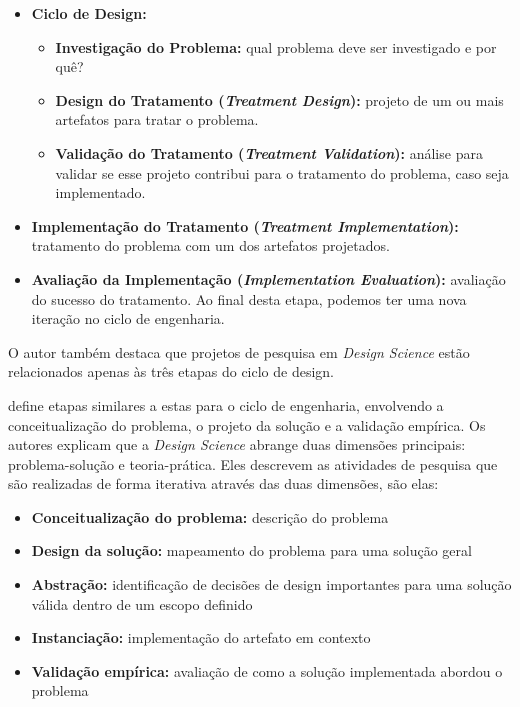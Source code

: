 \begin{itemize}
    \item \textbf{Ciclo de Design:}
    \begin{itemize}
        \item \textbf{Investigação do Problema:} qual problema deve ser investigado e por quê?
        \item \textbf{Design do Tratamento (\textit{Treatment Design}):} projeto de um ou mais artefatos para tratar o problema.
        \item \textbf{Validação do Tratamento (\textit{Treatment Validation}):} análise para validar se esse projeto contribui para o tratamento do problema, caso seja implementado.
    \end{itemize}
    \item \textbf{Implementação do Tratamento (\textit{Treatment Implementation}):} tratamento do problema com um dos artefatos projetados.
    \item \textbf{Avaliação da Implementação (\textit{Implementation Evaluation}):} avaliação do sucesso do tratamento. Ao final desta etapa, podemos ter uma nova iteração no ciclo de engenharia.
\end{itemize}

\noindent O autor também destaca que projetos de pesquisa em \textit{Design Science} estão relacionados apenas às três etapas do ciclo de design.

\citet{runeson2020design} define etapas similares a estas para o ciclo de engenharia, envolvendo a conceitualização do problema, o projeto da solução e a validação empírica. Os autores explicam que a \textit{Design Science} abrange duas dimensões principais: problema-solução e teoria-prática. Eles descrevem as atividades de pesquisa que são realizadas de forma iterativa através das duas dimensões, são elas:

\begin{itemize}
    \item \textbf{Conceitualização do problema:} descrição do problema
    \item \textbf{Design da solução:} mapeamento do problema para uma solução geral
    \item \textbf{Abstração:} identificação de decisões de design importantes para uma solução válida dentro de um escopo definido
    \item \textbf{Instanciação:} implementação do artefato em contexto
    \item \textbf{Validação empírica:} avaliação de como a solução implementada abordou o problema
\end{itemize}

